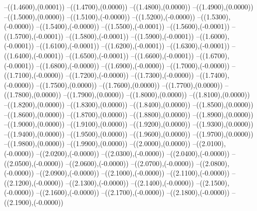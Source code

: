 {	--({\sx*(1.4600)},{\sy*(0.0001)})
	--({\sx*(1.4700)},{\sy*(0.0000)})
	--({\sx*(1.4800)},{\sy*(0.0000)})
	--({\sx*(1.4900)},{\sy*(0.0000)})
	--({\sx*(1.5000)},{\sy*(0.0000)})
	--({\sx*(1.5100)},{\sy*(-0.0000)})
	--({\sx*(1.5200)},{\sy*(-0.0000)})
	--({\sx*(1.5300)},{\sy*(-0.0000)})
	--({\sx*(1.5400)},{\sy*(-0.0000)})
	--({\sx*(1.5500)},{\sy*(-0.0001)})
	--({\sx*(1.5600)},{\sy*(-0.0001)})
	--({\sx*(1.5700)},{\sy*(-0.0001)})
	--({\sx*(1.5800)},{\sy*(-0.0001)})
	--({\sx*(1.5900)},{\sy*(-0.0001)})
	--({\sx*(1.6000)},{\sy*(-0.0001)})
	--({\sx*(1.6100)},{\sy*(-0.0001)})
	--({\sx*(1.6200)},{\sy*(-0.0001)})
	--({\sx*(1.6300)},{\sy*(-0.0001)})
	--({\sx*(1.6400)},{\sy*(-0.0001)})
	--({\sx*(1.6500)},{\sy*(-0.0001)})
	--({\sx*(1.6600)},{\sy*(-0.0001)})
	--({\sx*(1.6700)},{\sy*(-0.0001)})
	--({\sx*(1.6800)},{\sy*(-0.0000)})
	--({\sx*(1.6900)},{\sy*(-0.0000)})
	--({\sx*(1.7000)},{\sy*(-0.0000)})
	--({\sx*(1.7100)},{\sy*(-0.0000)})
	--({\sx*(1.7200)},{\sy*(-0.0000)})
	--({\sx*(1.7300)},{\sy*(-0.0000)})
	--({\sx*(1.7400)},{\sy*(-0.0000)})
	--({\sx*(1.7500)},{\sy*(0.0000)})
	--({\sx*(1.7600)},{\sy*(0.0000)})
	--({\sx*(1.7700)},{\sy*(0.0000)})
	--({\sx*(1.7800)},{\sy*(0.0000)})
	--({\sx*(1.7900)},{\sy*(0.0000)})
	--({\sx*(1.8000)},{\sy*(0.0000)})
	--({\sx*(1.8100)},{\sy*(0.0000)})
	--({\sx*(1.8200)},{\sy*(0.0000)})
	--({\sx*(1.8300)},{\sy*(0.0000)})
	--({\sx*(1.8400)},{\sy*(0.0000)})
	--({\sx*(1.8500)},{\sy*(0.0000)})
	--({\sx*(1.8600)},{\sy*(0.0000)})
	--({\sx*(1.8700)},{\sy*(0.0000)})
	--({\sx*(1.8800)},{\sy*(0.0000)})
	--({\sx*(1.8900)},{\sy*(0.0000)})
	--({\sx*(1.9000)},{\sy*(0.0000)})
	--({\sx*(1.9100)},{\sy*(0.0000)})
	--({\sx*(1.9200)},{\sy*(0.0000)})
	--({\sx*(1.9300)},{\sy*(0.0000)})
	--({\sx*(1.9400)},{\sy*(0.0000)})
	--({\sx*(1.9500)},{\sy*(0.0000)})
	--({\sx*(1.9600)},{\sy*(0.0000)})
	--({\sx*(1.9700)},{\sy*(0.0000)})
	--({\sx*(1.9800)},{\sy*(0.0000)})
	--({\sx*(1.9900)},{\sy*(0.0000)})
	--({\sx*(2.0000)},{\sy*(0.0000)})
	--({\sx*(2.0100)},{\sy*(-0.0000)})
	--({\sx*(2.0200)},{\sy*(-0.0000)})
	--({\sx*(2.0300)},{\sy*(-0.0000)})
	--({\sx*(2.0400)},{\sy*(-0.0000)})
	--({\sx*(2.0500)},{\sy*(-0.0000)})
	--({\sx*(2.0600)},{\sy*(-0.0000)})
	--({\sx*(2.0700)},{\sy*(-0.0000)})
	--({\sx*(2.0800)},{\sy*(-0.0000)})
	--({\sx*(2.0900)},{\sy*(-0.0000)})
	--({\sx*(2.1000)},{\sy*(-0.0000)})
	--({\sx*(2.1100)},{\sy*(-0.0000)})
	--({\sx*(2.1200)},{\sy*(-0.0000)})
	--({\sx*(2.1300)},{\sy*(-0.0000)})
	--({\sx*(2.1400)},{\sy*(-0.0000)})
	--({\sx*(2.1500)},{\sy*(-0.0000)})
	--({\sx*(2.1600)},{\sy*(-0.0000)})
	--({\sx*(2.1700)},{\sy*(-0.0000)})
	--({\sx*(2.1800)},{\sy*(-0.0000)})
	--({\sx*(2.1900)},{\sy*(-0.0000)})
}
